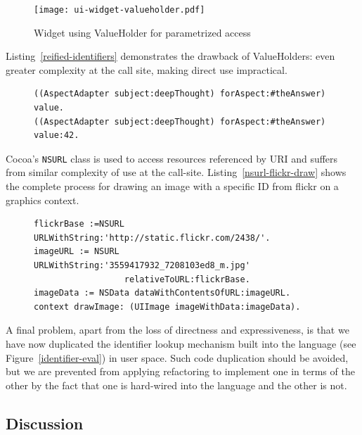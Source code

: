 \documentclass[preprint]{sigplanconf}
\begin{document}
\begin{figure}[htbp]
\centering
\texttt{[image: ui-widget-valueholder.pdf]}
\caption{Widget using ValueHolder for parametrized access}
\label{ui-widget-valueholder}

\end{figure}

Listing~\ref{reified-identifiers} demonstrates the drawback of ValueHolders:  even greater complexity at the
call site, making direct use impractical. 


\begin{figure}[htbp]
\begin{lstlisting}[style=numbers,label=reified-identifiers,caption=Retrieve and store value via AspectAdaptor ValueHolder.]
((AspectAdapter subject:deepThought) forAspect:#theAnswer) value.
((AspectAdapter subject:deepThought) forAspect:#theAnswer) value:42.
\end{lstlisting}
\end{figure}

Cocoa's {\tt NSURL} class is used to access resources referenced by URI and suffers from similar complexity
of use at the call-site.  Listing~\ref{nsurl-flickr-draw}
shows the complete process for drawing an image with a specific ID from flickr on a graphics context.

\begin{figure}[htbp]
\begin{lstlisting}[style=numbers,label=nsurl-flickr-draw,caption=Retrieving and drawing an image stored on flickr.com.]
flickrBase :=NSURL URLWithString:'http://static.flickr.com/2438/'.
imageURL := NSURL URLWithString:'3559417932_7208103ed8_m.jpg'
                  relativeToURL:flickrBase.
imageData := NSData dataWithContentsOfURL:imageURL.
context drawImage: (UIImage imageWithData:imageData).
\end{lstlisting}
\end{figure}


A final problem, apart from the loss of directness and expressiveness, is that we have now 
duplicated the identifier lookup mechanism built into the language (see Figure~\ref{identifier-eval})
in user space.  Such code duplication should be avoided, but we are prevented from applying refactoring
to implement one in terms of the other by the fact that one is hard-wired into the language and the other is not.

\subsection{Discussion}
\end{document}
